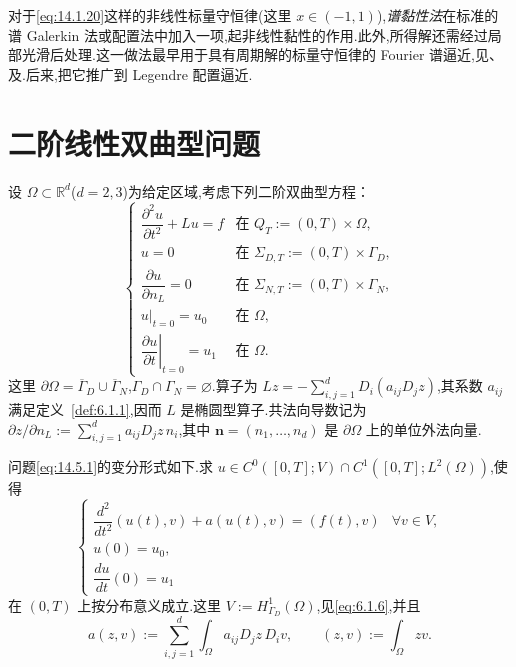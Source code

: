 对于\eqref{eq:14.1.20}这样的非线性标量守恒律(这里 \(x\in(-1,1)\)),\emph{谱黏性法}在标准的谱 Galerkin 法或配置法中加入一项,起非线性黏性的作用.此外,所得解还需经过局部光滑后处理.这一做法最早用于具有周期解的标量守恒律的 Fourier 谱逼近,见、及.后来,把它推广到 Legendre 配置逼近.

\section{二阶线性双曲型问题}\label{sec:14.5}

设 \(\Omega\subset\mathbb R^d\)(\(d=2,3\))为给定区域,考虑下列二阶双曲型方程：
\begin{equation}\label{eq:14.5.1}
  \begin{cases}
    \dfrac{\partial^2u}{\partial t^2}+Lu=f &\text{在 }Q_T:=(0,T)\times\Omega,\\[2pt]
    u=0 &\text{在 }\Sigma_{D,T}:=(0,T)\times\Gamma_D,\\[2pt]
    \dfrac{\partial u}{\partial n_L}=0 &\text{在 }\Sigma_{N,T}:=(0,T)\times\Gamma_N,\\[2pt]
    u|_{t=0}=u_0 &\text{在 }\Omega,\\[2pt]
    \left.\dfrac{\partial u}{\partial t}\right|_{t=0}=u_1 &\text{在 }\Omega.
  \end{cases}
\end{equation}
这里 \(\partial\Omega=\overline\Gamma_D\cup\overline\Gamma_N\),\(\Gamma_D\cap\Gamma_N=\varnothing\).算子为 \(Lz=-\sum_{i,j=1}^dD_i(a_{ij}D_jz)\),其系数 \(a_{ij}\) 满足定义~\ref{def:6.1.1},因而 \(L\) 是椭圆型算子.共法向导数记为 \(\partial z/\partial n_L:=\sum_{i,j=1}^d a_{ij}D_jz\,n_i\),其中 \(\boldsymbol{n}=(n_1,\ldots,n_d)\) 是 \(\partial\Omega\) 上的单位外法向量.

问题\eqref{eq:14.5.1}的变分形式如下.求 \(u\in C^0([0,T];V)\cap C^1([0,T];L^2(\Omega))\),使得
\begin{equation}\label{eq:14.5.2}
  \begin{cases}
    \dfrac{d^2}{dt^2}(u(t),v)+a(u(t),v)=(f(t),v)
         &\forall v\in V,\\[2pt]
    u(0)=u_0,\\
    \dfrac{du}{dt}(0)=u_1
  \end{cases}
\end{equation}
在 \((0,T)\) 上按分布意义成立.这里 \(V:=H_{\Gamma_D}^1(\Omega)\),见\eqref{eq:6.1.6},并且
\[
  a(z,v):=\sum_{i,j=1}^d\int_\Omega a_{ij}D_jz\,D_iv,\qquad
  (z,v):=\int_\Omega zv.
\]

